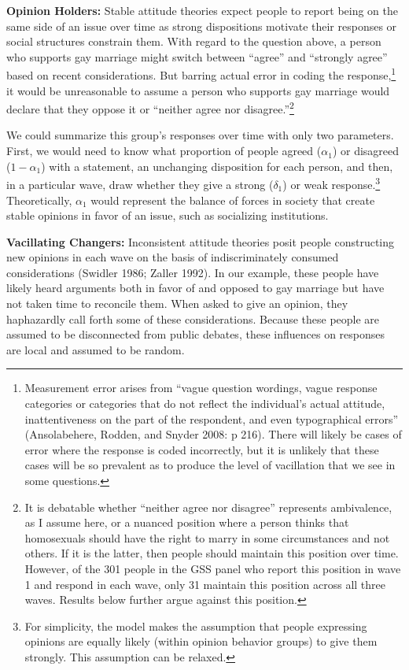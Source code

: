 \documentclass[12pt,]{article}
\begin{document}
\textbf{Opinion Holders:} Stable attitude theories expect people to report being on the same side of an issue over time as strong dispositions motivate their responses or social structures constrain them. With regard to the question above, a person who supports gay marriage might switch between ``agree'' and ``strongly agree'' based on recent considerations. But barring actual error in coding the response,\footnote{Measurement error arises from ``vague question wordings, vague response categories or categories that do not reflect the individual's actual attitude, inattentiveness on the part of the respondent, and even typographical errors'' (Ansolabehere, Rodden, and Snyder 2008: p 216). There will likely be cases of error where the response is coded incorrectly, but it is unlikely that these cases will be so prevalent as to produce the level of vacillation that we see in some questions.} it would be unreasonable to assume a person who supports gay marriage would declare that they oppose it or ``neither agree nor disagree.''\footnote{It is debatable whether ``neither agree nor disagree'' represents ambivalence, as I assume here, or a nuanced position where a person thinks that homosexuals should have the right to marry in some circumstances and not others. If it is the latter, then people should maintain this position over time. However, of the 301 people in the GSS panel who report this position in wave 1 and respond in each wave, only 31 maintain this position across all three waves. Results below further argue against this position.}

We could summarize this group's responses over time with only two parameters. First, we would need to know what proportion of people agreed (\(\alpha_1\)) or disagreed (\(1-\alpha_1\)) with a statement, an unchanging disposition for each person, and then, in a particular wave, draw whether they give a strong (\(\delta_1\)) or weak response.\footnote{For simplicity, the model makes the assumption that people expressing opinions are equally likely (within opinion behavior groups) to give them strongly. This assumption can be relaxed.} Theoretically, \(\alpha_1\) would represent the balance of forces in society that create stable opinions in favor of an issue, such as socializing institutions.

\textbf{Vacillating Changers:} Inconsistent attitude theories posit people constructing new opinions in each wave on the basis of indiscriminately consumed considerations (Swidler 1986; Zaller 1992). In our example, these people have likely heard arguments both in favor of and opposed to gay marriage but have not taken time to reconcile them. When asked to give an opinion, they haphazardly call forth some of these considerations. Because these people are assumed to be disconnected from public debates, these influences on responses are local and assumed to be random.
\end{document}
